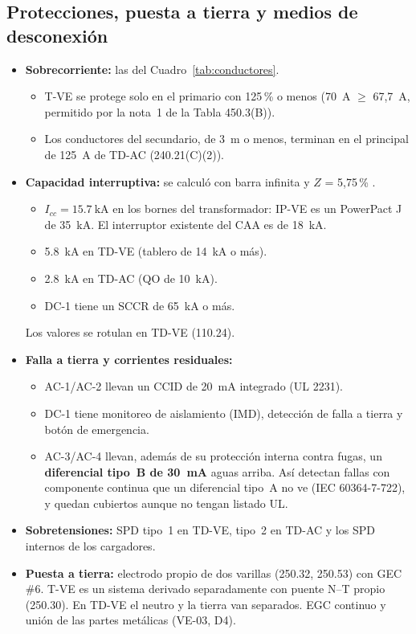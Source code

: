 \subsection{Protecciones, puesta a tierra y medios de desconexión}
\label{sec:cc}
\begin{itemize}
\item \textbf{Sobrecorriente:} las del Cuadro~\ref{tab:conductores}.
  \begin{itemize}
  \item T-VE se protege solo en el primario con 125\,\% o menos (70~A $\ge$ 67,7~A, permitido por la nota~1 de la Tabla 450.3(B)).
  \item Los conductores del secundario, de 3~m o menos, terminan en el principal de 125~A de TD-AC (240.21(C)(2)).
  \end{itemize}
\item \textbf{Capacidad interruptiva:} se calculó con barra infinita y $Z$ = 5,75\,\% \supuesto{}.
  \begin{itemize}
  \item $I_{cc}=\SI{15.7}{\kilo\ampere}$ en los bornes del transformador: IP-VE es un PowerPact J de 35~kA. El interruptor existente del CAA es de 18~kA.
  \item \SI{5.8}{\kilo\ampere} en TD-VE (tablero de 14~kA o más).
  \item \SI{2.8}{\kilo\ampere} en TD-AC (QO de 10~kA).
  \item DC-1 tiene un SCCR de 65~kA o más.
  \end{itemize}
  Los valores se rotulan en TD-VE (110.24).
\item \textbf{Falla a tierra y corrientes residuales:}
  \begin{itemize}
  \item AC-1/AC-2 llevan un CCID de 20~mA integrado (UL 2231).
  \item DC-1 tiene monitoreo de aislamiento (IMD), detección de falla a tierra y botón de emergencia.
  \item AC-3/AC-4 llevan, además de su protección interna contra fugas, un \textbf{diferencial tipo~B de 30~mA} aguas arriba. Así detectan fallas con componente continua que un diferencial tipo~A no ve (IEC 60364-7-722), y quedan cubiertos aunque no tengan listado UL.
  \end{itemize}
\item \textbf{Sobretensiones:} SPD tipo~1 en TD-VE, tipo~2 en TD-AC y los SPD internos de los cargadores.
\item \textbf{Puesta a tierra:} electrodo propio de dos varillas (250.32, 250.53) con GEC \#6. T-VE es un sistema derivado separadamente con puente N--T propio (250.30). En TD-VE el neutro y la tierra van separados. EGC continuo y unión de las partes metálicas (VE-03, D4).

\end{itemize}
